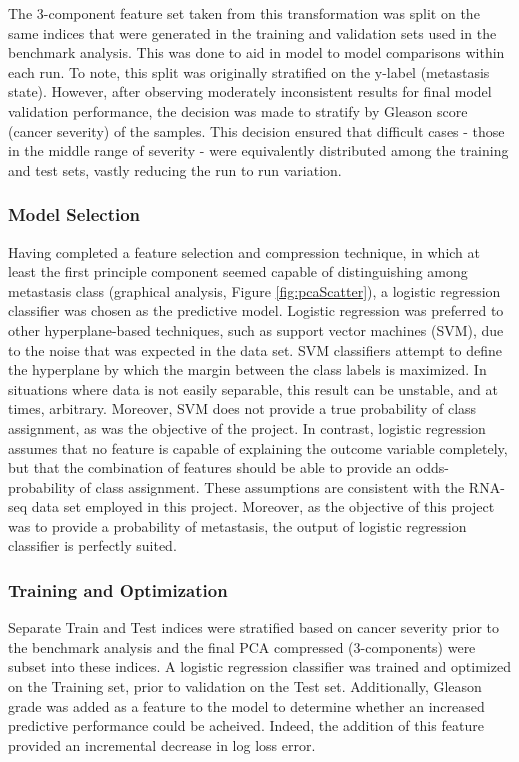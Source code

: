 \documentclass[final]{article}
\begin{document}
The 3-component feature set taken from this transformation was split on the same indices that were generated in
the training and validation sets used in the benchmark analysis.  This was done
to aid in model to model comparisons within each run.  To note, this split was
originally stratified on the y-label (metastasis state).  However, after
observing moderately inconsistent results for final model validation
performance, the decision was made to stratify by Gleason score (cancer
severity) of the samples.   This decision ensured that difficult cases - those
in the middle range of severity - were equivalently distributed among the
training and test sets, vastly reducing the run to run variation.

\subsubsection{Model Selection}

Having completed a feature selection and compression technique, in which at
least the first principle component seemed capable of distinguishing among
metastasis class (graphical analysis, Figure \ref{fig:pcaScatter}), a
logistic regression classifier was chosen as the predictive model.  Logistic
regression was preferred  to other hyperplane-based techniques, such as support
vector machines (SVM), due to the noise that was expected in the
data set. SVM classifiers attempt to define the hyperplane by which the margin
between the class labels is maximized.  In situations where data is not easily
separable, this result can be unstable, and  at times, arbitrary.  Moreover, SVM
does not provide a true probability of class assignment, as was the objective of
the project.  In contrast, logistic regression assumes that no feature  is
capable of explaining the outcome variable completely, but that the combination of features
should be able to provide an odds-probability of class assignment.  These assumptions
are consistent with the RNA-seq data set employed in this project.  Moreover, as the
objective of this project was to provide a probability of metastasis, the output
of logistic regression classifier is perfectly suited.

\subsubsection{Training and Optimization}

Separate Train and Test indices were stratified based on cancer severity prior
to the benchmark analysis and the final PCA compressed (3-components) were
subset into these indices.  A logistic regression classifier was trained and
optimized on the Training set, prior to validation on the Test set.  Additionally,
Gleason grade was added as a feature to the model to determine whether an increased
predictive performance could be acheived.  Indeed, the addition of this feature
provided an incremental decrease in log loss error.
\end{document}
